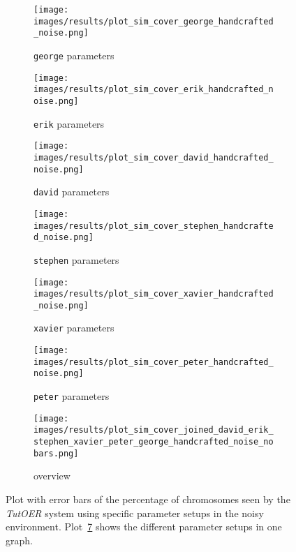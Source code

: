 \begin{figure}[ht]
	\begin{subfigure}{0.48\linewidth}
	\texttt{[image: images/results/plot\_sim\_cover\_george\_handcrafted\_noise.png]}
	\caption{\texttt{george} parameters}
	\label{fig:cover_handcrafted_noise_george}
	\end{subfigure}
	\hfill
	\begin{subfigure}{0.48\linewidth}
	\texttt{[image: images/results/plot\_sim\_cover\_erik\_handcrafted\_noise.png]}
	\caption{\texttt{erik} parameters}
	\label{fig:cover_handcrafted_noise_erik}
	\end{subfigure}
	\begin{subfigure}{0.48\linewidth}
	\texttt{[image: images/results/plot\_sim\_cover\_david\_handcrafted\_noise.png]}
	\caption{\texttt{david} parameters}
	\label{fig:cover_handcrafted_noise_david}
	\end{subfigure}
	\hfill
	\begin{subfigure}{0.48\linewidth}
	\texttt{[image: images/results/plot\_sim\_cover\_stephen\_handcrafted\_noise.png]}
	\caption{\texttt{stephen} parameters}
	\label{fig:cover_handcrafted_noise_stephen}
	\end{subfigure}
	\begin{subfigure}{0.48\linewidth}
	\texttt{[image: images/results/plot\_sim\_cover\_xavier\_handcrafted\_noise.png]}
	\caption{\texttt{xavier} parameters}
	\label{fig:cover_handcrafted_noise_xavier}
	\end{subfigure}
	\hfill
	\begin{subfigure}{0.48\linewidth}
	\texttt{[image: images/results/plot\_sim\_cover\_peter\_handcrafted\_noise.png]}
	\caption{\texttt{peter} parameters}
	\label{fig:cover_handcrafted_noise_peter}
	\end{subfigure}
	\begin{subfigure}{\linewidth}
	\texttt{[image: images/results/plot\_sim\_cover\_joined\_david\_erik\_stephen\_xavier\_peter\_george\_handcrafted\_noise\_nobars.png]}
	\caption{overview}
	\label{fig:cover_handcrafted_noise_overview_group1}
	\end{subfigure}
	\caption[Percentage of chromosomes seen in noisy simulated environment for
	group 1]{Plot with error bars of the percentage of chromosomes seen by the \emph{TutOER}
	system using specific parameter setups in the noisy environment.
	Plot~\ref{fig:cover_handcrafted_noise_overview_group1} shows the
	different parameter setups in one graph.}
	\label{fig:cover_handcrafted_noise_container_group1}
\end{figure}

